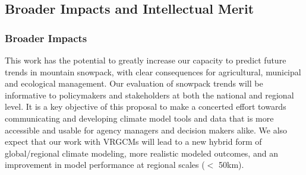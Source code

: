 \documentclass[11pt]{article}
\begin{document}
\subsection{Broader Impacts and Intellectual Merit}

\subsubsection{Broader Impacts}

This work has the potential to greatly increase our capacity to predict future trends in mountain snowpack, with clear consequences for agricultural, municipal and ecological management.  Our evaluation of snowpack trends will be informative to policymakers and stakeholders at both the national and regional level.  It is a key objective of this proposal to make a concerted effort towards communicating and developing climate model tools and data that is more accessible and usable for agency managers and decision makers alike.  We also expect that our work with VRGCMs will lead to a new hybrid form of global/regional climate modeling, more realistic modeled outcomes, and an improvement in model performance at regional scales ($<$ 50km).

  

\end{document}
